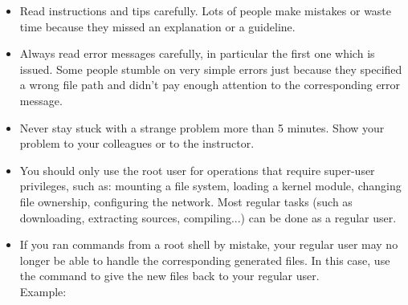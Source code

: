 \begin{itemize}

\item Read instructions and tips carefully. Lots of people make
  mistakes or waste time because they missed an explanation or a
  guideline.

\item Always read error messages carefully, in particular the first
  one which is issued. Some people stumble on very simple errors just
  because they specified a wrong file path and didn't pay enough
  attention to the corresponding error message.

\item Never stay stuck with a strange problem more than 5
  minutes. Show your problem to your colleagues or to the instructor.

\item You should only use the root user for operations that require
  super-user privileges, such as: mounting a file system, loading a
  kernel module, changing file ownership, configuring the
  network. Most regular tasks (such as downloading, extracting
  sources, compiling...) can be done as a regular user.

\item If you ran commands from a root shell by mistake, your regular
  user may no longer be able to handle the corresponding generated
  files. In this case, use the  command to give the new
  files back to your regular user.\\
  Example: 

\end{itemize}

